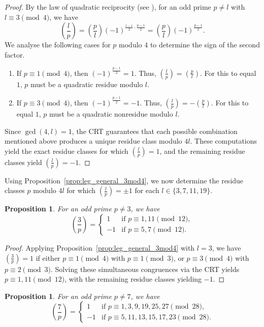 \documentclass[11pt,a4paper]{amsart}
\theoremstyle{plain}
\newtheorem{proposition}[theorem]{Proposition}
\theoremstyle{definition}
\begin{document}
\begin{proof}
By the law of quadratic reciprocity (see \cite[Theorem~9.9]{Burton}), for an odd prime $p \neq l$ with $l \equiv 3 \pmod{4}$, we have
\[
\left(\frac{l}{p}\right) = \left(\frac{p}{l}\right) (-1)^{\frac{l-1}{2} \cdot \frac{p-1}{2}}= \left(\frac{p}{l}\right) (-1)^{\frac{p-1}{2}}.
\]
We analyse the following cases for $p$ modulo $4$ to determine the sign of the second factor.
\begin{enumerate}[label=(\alph*)]
\item If $p \equiv 1 \pmod 4$, then $(-1)^{\frac{p-1}{2}} = 1$. Thus, $\left(\frac{l}{p}\right) = \left(\frac{p}{l}\right)$. For this to equal $1$, $p$ must be a quadratic residue modulo $l$.
    \item If $p \equiv 3 \pmod 4$, then $(-1)^{\frac{p-1}{2}} = -1$. Thus, $\left(\frac{l}{p}\right) = -\left(\frac{p}{l}\right)$. For this to equal $1$, $p$ must be a quadratic nonresidue modulo $l$.
\end{enumerate}
Since $\gcd(4, l) = 1$, the CRT guarantees that each possible combination mentioned above produces a unique residue class modulo $4l$. These computations yield the exact residue classes for which $\left(\frac{l}{p}\right) = 1$, and the remaining residue classes yield $\left(\frac{l}{p}\right) = -1$.
\end{proof}
Using Proposition~\ref{prop:leg_general_3mod4}, we now determine the residue classes $p$ modulo $4l$ for which $\left(\frac{l}{p}\right)=\pm1$ for each $l \in \{3,7,11,19\}$.
\begin{proposition}\label{prop:leg3}
For an odd prime $p \neq 3$, we have
\[
\left(\frac{3}{p}\right) = 
\begin{cases}
    1 & \text{if } p \equiv 1, 11 \pmod{12}, \\
    -1 & \text{if } p \equiv 5, 7 \pmod{12}.
\end{cases}
\]
\end{proposition}
\begin{proof}
Applying Proposition~\ref{prop:leg_general_3mod4} with $l=3$, we have $\left(\frac{3}{p}\right) = 1$ if either $p \equiv 1 \pmod 4$ with $p \equiv 1 \pmod 3$, or $p \equiv 3 \pmod 4$ with $p \equiv 2 \pmod 3$. Solving these simultaneous congruences via the CRT yields $p \equiv 1, 11 \pmod{12}$, with the remaining residue classes yielding $-1$.
\end{proof}
\begin{proposition}\label{prop:leg7}
For an odd prime $p \neq 7$, we have
\[
\left(\frac{7}{p}\right) = 
\begin{cases}
    1 & \text{if } p \equiv 1, 3, 9, 19, 25, 27 \pmod{28}, \\
    -1 & \text{if } p \equiv 5, 11, 13, 15, 17, 23 \pmod{28}.
\end{cases}
\]\end{proposition}
\end{document}
